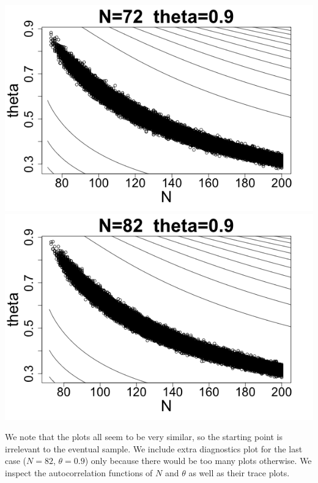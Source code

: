 \documentclass[letterpaper,10pt]{amsart}
\begin{document}
\begin{enumerate}[{1}.1]
\begin{center}
\end{center}
\begin{center}
\includegraphics[scale=0.25]{Stat221Waterbuck5.png}
\includegraphics[scale=0.25]{Stat221Waterbuck10.png}
\end{center}
We note that the plots all seem to be very similar, so the starting point is irrelevant to the eventual sample. We include extra diagnostics plot for the last case ($N=82$, $\theta=0.9$) only because there would be too many plots otherwise. We inspect the autocorrelation functions of $N$ and $\theta$ as well as their trace plots. 
\begin{center}

\end{center}
\end{enumerate}
\end{document}
